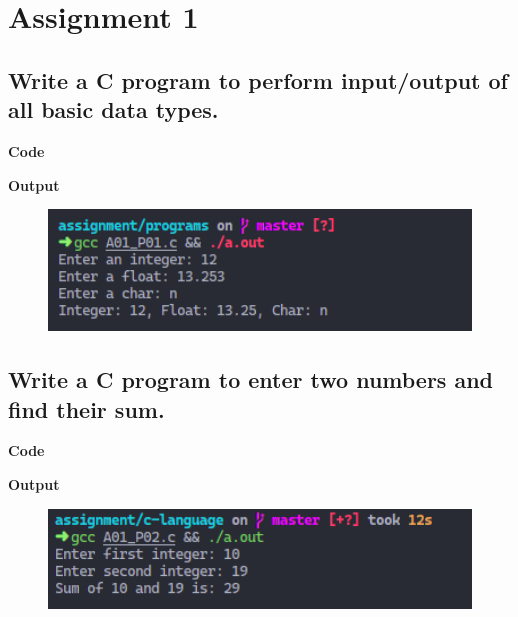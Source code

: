 \documentclass[a4paper]{article}
\begin{document}
\tableofcontents
\newpage


\section{Assignment 1}


\subsection{Write a C program to perform input/output of all basic data types.}
\textbf{Code}



\textbf{Output}

\begin{figure}[h]
  \includegraphics[width=12cm]{A01_P01.png}
\end{figure}

\newpage



\subsection{Write a C program to enter two numbers and find their sum.}
\textbf{Code}



\textbf{Output}

\begin{figure}[h]
  \includegraphics[width=12cm]{A01_P02}
\end{figure}

\newpage


\end{document}
